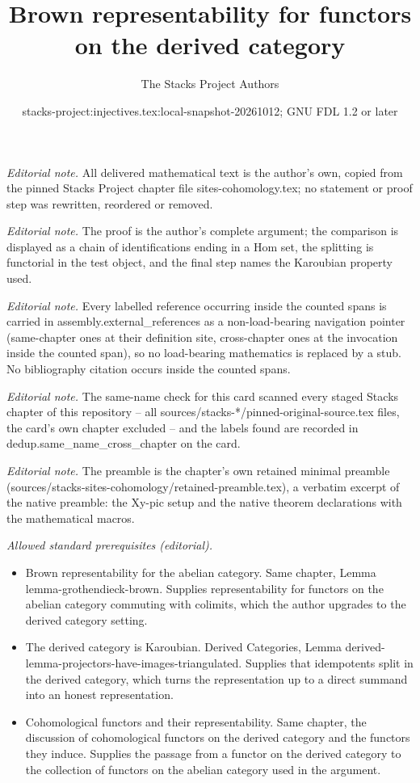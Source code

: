\documentclass[10pt,a4paper]{amsart}
\title{Brown representability for functors on the derived category}
\author{The Stacks Project Authors}
\date{stacks-project:injectives.tex:local-snapshot-20261012; GNU FDL 1.2 or later}
\theoremstyle{plain}
\theoremstyle{definition}
\theoremstyle{remark}
\numberwithin{equation}{subsection}
\begin{document}
\maketitle
\noindent\textit{Editorial note.} All delivered mathematical text is the author's own, copied from the pinned Stacks Project chapter file sites-cohomology.tex; no statement or proof step was rewritten, reordered or removed.\par\medskip
\noindent\textit{Editorial note.} The proof is the author's complete argument; the comparison is displayed as a chain of identifications ending in a Hom set, the splitting is functorial in the test object, and the final step names the Karoubian property used.\par\medskip
\noindent\textit{Editorial note.} Every labelled reference occurring inside the counted spans is carried in assembly.external\_references as a non-load-bearing navigation pointer (same-chapter ones at their definition site, cross-chapter ones at the invocation inside the counted span), so no load-bearing mathematics is replaced by a stub. No bibliography citation occurs inside the counted spans.\par\medskip
\noindent\textit{Editorial note.} The same-name check for this card scanned every staged Stacks chapter of this repository -- all sources/stacks-*/pinned-original-source.tex files, the card's own chapter excluded -- and the labels found are recorded in dedup.same\_name\_cross\_chapter on the card.\par\medskip
\noindent\textit{Editorial note.} The preamble is the chapter's own retained minimal preamble (sources/stacks-sites-cohomology/retained-preamble.tex), a verbatim excerpt of the native preamble: the Xy-pic setup and the native theorem declarations with the mathematical macros.\par\medskip
\noindent\textit{Allowed standard prerequisites (editorial).}\begin{itemize}
\item Brown representability for the abelian category. Same chapter, Lemma lemma-grothendieck-brown. Supplies representability for functors on the abelian category commuting with colimits, which the author upgrades to the derived category setting.
\item The derived category is Karoubian. Derived Categories, Lemma derived-lemma-projectors-have-images-triangulated. Supplies that idempotents split in the derived category, which turns the representation up to a direct summand into an honest representation.
\item Cohomological functors and their representability. Same chapter, the discussion of cohomological functors on the derived category and the functors they induce. Supplies the passage from a functor on the derived category to the collection of functors on the abelian category used in the argument.
\end{itemize}\medskip
\end{document}
